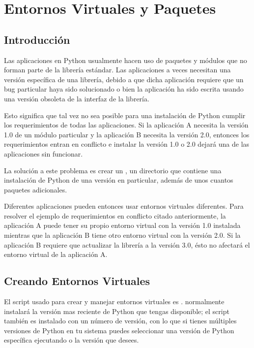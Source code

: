 \documentclass[a4,10pt,spanish]{sphinxmanual}
\begin{document}
\chapter{Entornos Virtuales y Paquetes}
\label{\detokenize{tutorial/venv:virtual-environments-and-packages}}\label{\detokenize{tutorial/venv:tut-venv}}\label{\detokenize{tutorial/venv::doc}}

\section{Introducción}
\label{\detokenize{tutorial/venv:introduction}}
\sphinxAtStartPar
Las aplicaciones en Python usualmente hacen uso de paquetes y módulos que no forman parte de la librería estándar. Las aplicaciones a veces necesitan una versión específica de una librería, debido a que dicha aplicación requiere que un bug particular haya sido solucionado o bien la aplicación ha sido escrita usando una versión obsoleta de la interfaz de la librería.

\sphinxAtStartPar
Esto significa que tal vez no sea posible para una instalación de Python cumplir los requerimientos de todas las aplicaciones. Si la aplicación A necesita la versión 1.0 de un módulo particular y la aplicación B necesita la versión 2.0, entonces los requerimientos entran en conflicto e instalar la versión 1.0 o 2.0 dejará una de las aplicaciones sin funcionar.

\sphinxAtStartPar
La solución a este problema es crear un {\hyperref[\detokenize{glossary:term-virtual-environment}]{}},  un directorio que contiene una instalación de Python de una versión en particular,  además de unos cuantos paquetes adicionales.

\sphinxAtStartPar
Diferentes aplicaciones pueden entonces usar entornos virtuales diferentes.  Para resolver el ejemplo de requerimientos en conflicto citado anteriormente, la aplicación A puede tener su propio entorno virtual con la versión 1.0 instalada mientras que la aplicación B tiene otro entorno virtual con la versión 2.0.  Si la aplicación B requiere que actualizar la librería a la versión 3.0, ésto no afectará el entorno virtual de la aplicación A.


\section{Creando Entornos Virtuales}
\label{\detokenize{tutorial/venv:creating-virtual-environments}}
\sphinxAtStartPar
El script usado para crear y manejar entornos virtuales es .   normalmente instalará la versión mas reciente de Python que tengas disponible; el script también es instalado con un número de versión, con lo que si tienes múltiples versiones de Python en tu sistema puedes seleccionar una versión de Python específica ejecutando  o la versión que desees.
\end{document}
